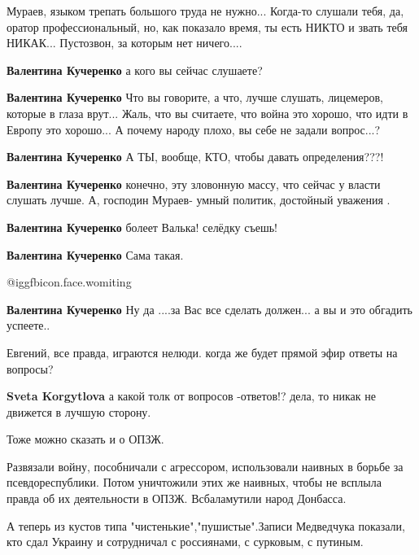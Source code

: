 \begin{itemize}

Мураев, языком трепать большого труда не нужно...
Когда-то слушали тебя, да, оратор профессиональный, но, как показало время, ты есть НИКТО и звать тебя НИКАК...
Пустозвон, за которым нет ничего....

\begin{itemize} %
\textbf{Валентина Кучеренко} а кого вы сейчас слушаете?

\textbf{Валентина Кучеренко} Что вы говорите, а что, лучше слушать, лицемеров, которые в глаза врут... Жаль, что вы считаете, что война это хорошо, что идти в Европу это хорошо... А почему народу плохо, вы себе не задали вопрос...?

\textbf{Валентина Кучеренко} А ТЫ, вообще, КТО, чтобы давать определения???!

\textbf{Валентина Кучеренко} конечно, эту зловонную массу, что сейчас у власти слушать лучше. А, господин Мураев- умный политик, достойный уважения .

\textbf{Валентина Кучеренко} болеет Валька! селёдку съешь!

\textbf{Валентина Кучеренко} Сама такая.

 @igg{fbicon.face.womiting} 

\textbf{Валентина Кучеренко} Ну да ....за Вас все сделать должен... а вы и это обгадить успеете..
\end{itemize} %

Евгений, все правда, играются нелюди. когда же будет прямой эфир ответы на вопросы?

\begin{itemize} %
\textbf{Sveta Korgytlova} а какой толк от вопросов -ответов!?
дела, то никак не движется в лучшую сторону.
\end{itemize} %


Тоже можно сказать и о ОПЗЖ.

Развязали войну, пособничали с агрессором, использовали наивных в борьбе за
псевдореспублики. Потом уничтожили этих же наивных, чтобы не всплыла правда об
их деятельности в ОПЗЖ. Всбаламутили народ Донбасса.

А теперь из кустов типа "чистенькие","пушистые".Записи Медведчука показали, кто
сдал Украину и сотрудничал с россиянами, с сурковым, с путиным.


\end{itemize}
